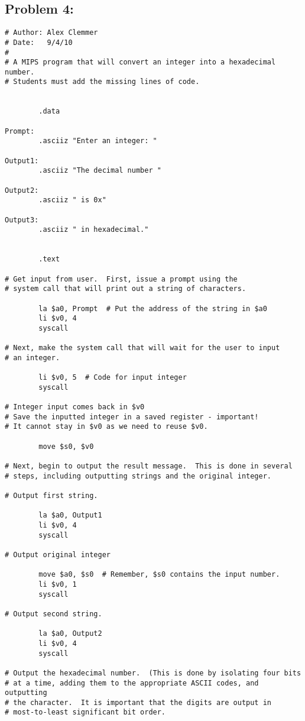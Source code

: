 \documentclass[a4paper]{article}
\begin{document}
\subsection*{Problem 4:}
\begin{Verbatim}[fontsize=\small]
# Author: Alex Clemmer
# Date:   9/4/10
#
# A MIPS program that will convert an integer into a hexadecimal number.
# Students must add the missing lines of code.


        .data

Prompt:
        .asciiz "Enter an integer: "

Output1:
        .asciiz "The decimal number "
        
Output2:
        .asciiz " is 0x"

Output3:
        .asciiz " in hexadecimal."

        
        .text

# Get input from user.  First, issue a prompt using the
# system call that will print out a string of characters.

        la $a0, Prompt  # Put the address of the string in $a0
        li $v0, 4
        syscall

# Next, make the system call that will wait for the user to input
# an integer.

        li $v0, 5  # Code for input integer
        syscall

# Integer input comes back in $v0
# Save the inputted integer in a saved register - important!
# It cannot stay in $v0 as we need to reuse $v0.

        move $s0, $v0

# Next, begin to output the result message.  This is done in several
# steps, including outputting strings and the original integer.

# Output first string.
        
        la $a0, Output1
        li $v0, 4
        syscall

# Output original integer
        
        move $a0, $s0  # Remember, $s0 contains the input number.
        li $v0, 1
        syscall

# Output second string.
        
        la $a0, Output2
        li $v0, 4
        syscall

# Output the hexadecimal number.  (This is done by isolating four bits
# at a time, adding them to the appropriate ASCII codes, and outputting
# the character.  It is important that the digits are output in
# most-to-least significant bit order.
        


\end{Verbatim}
\end{document}
